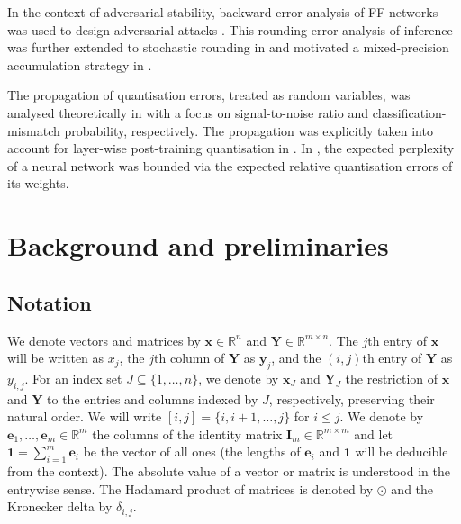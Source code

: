 \documentclass[namedate,webpdf,imanum]{ima-authoring-template}
\newcommand{\Real}{\mathbb{R}}
\newcommand{\Matrix}[1]{\mathbf{#1}}
\newcommand{\hap}{\mathbin{\odot}}
\newcommand{\One}{\Matrix{1}}
\numberwithin{equation}{section}
\begin{document}
In the context of adversarial stability, backward error analysis of FF networks was used to design adversarial attacks \citep{beuzeville2021adversarial, beerens2024adversarial}.
This rounding error analysis of inference was further extended to stochastic rounding in \cite{beuzeville2026deterministic} and motivated a mixed-precision accumulation strategy in \cite{el2025mixed}.

The propagation of quantisation errors, treated as random variables, was analysed theoretically in \cite{lin2016fixed, sakr2017analytical} with a focus on signal-to-noise ratio and classification-mismatch probability, respectively.
The propagation was explicitly taken into account for layer-wise post-training quantisation in \cite{nagel2020up, arai2025quantization}.
In \cite{malinovskii2025higgs}, the expected perplexity of a neural network was bounded via the expected relative quantisation errors of its weights.
\section{Background and preliminaries}
\label{sec:background}

\subsection{Notation}
\label{subsec:notation}
We denote vectors and matrices by $\Matrix{x} \in \Real^n$ and $\Matrix{Y} \in \Real^{m \times n}$.
The $j$th entry of $\Matrix{x}$ will be written as $x_j$, the $j$th column of $\Matrix{Y}$ as $\Matrix{y}_j$, and the $(i,j)$th entry of $\Matrix{Y}$ as $y_{i,j}$.
For an index set $J \subseteq \{ 1, \ldots, n \}$, we denote by $\Matrix{x}_{J}$ and $\Matrix{Y}_{J}$ the restriction of $\Matrix{x}$ and $\Matrix{Y}$ to the entries and columns indexed by $J$, respectively, preserving their natural order.
We will write $[i,j] = \{ i, i + 1, \ldots, j \}$ for $i \leq j$.
We denote by $\Matrix{e}_1, \ldots, \Matrix{e}_m \in \Real^m$ the columns of the identity matrix $\Matrix{I}_m \in \Real^{m \times m}$ and let $\One = \sum_{i = 1}^{m} \Matrix{e}_i$ be the vector of all ones (the lengths of $\Matrix{e}_i$ and $\One$ will be deducible from the context). 
The absolute value of a vector or matrix is understood in the entrywise sense.
The Hadamard product of matrices is denoted by $\hap$ and the Kronecker delta by $\delta_{i,j}$.
\end{document}
